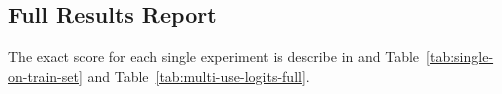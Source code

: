 \documentclass[11pt,a4paper]{article}
\begin{document}
\subsection{Full Results Report}
\label{apx:full-results-report}
The exact score for each single experiment is describe in and Table~\ref{tab:single-on-train-set} and Table~\ref{tab:multi-use-logits-full}.

%

\end{document}
